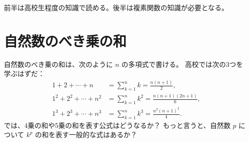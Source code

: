 {
\newcommand{\Natural}{\mathbf{N}}
\newcommand{\Rational}{\mathbf{Q}}
\newcommand{\Complex}{\mathbf{C}}

\renewcommand{\equationautorefname}{式}
\newtheorem{theorem}{定理}
\renewcommand{\theoremautorefname}{定理}
\newtheorem*{example*}{例}

\newtheorem{remark}[remark]{注意}
\newcommand{\remarkautorefname}{注意}

\newtheorem{lemma}[lemma]{補題}
\newcommand{\lemmaautorefname}{補題}

\newtheorem{proposition}[proposition]{命題}
\newcommand{\propositionautorefname}{命題}

\newtheorem{corollary}[corollary]{系}
\newcommand{\corollaryautorefname}{系}

\newcommand{\stirlingI}{\genfrac[]{0pt}{}} %
\newcommand{\stirlingII}{\genfrac\{\}{0pt}{}} %
\newcommand{\risingFactorial}[2]{{#1}^{\overline{#2}}}
\newcommand{\fallingFactorial}[2]{{#1}^{\underline{#2}}}

\renewcommand{\proofname}{証明}


前半は高校生程度の知識で読める。後半は複素関数の知識が必要となる。

\section{自然数のべき乗の和}
自然数のべき乗の和は、次のように $n$ の多項式で書ける。
高校では次の3つを学ぶはずだ：
\begin{align*}
  1+2+\dotsb+n&=\sum_{k=1}^n k=\frac{n(n+1)}{2}, \\
  1^2+2^2+\dotsb+n^2&=\sum_{k=1}^n k^2=\frac{n(n+1)(2n+1)}{6}, \\
  1^3+2^3+\dotsb+n^3&=\sum_{k=1}^n k^3=\frac{n^2(n+1)^2}{4}.
\end{align*}
では、4乗の和や5乗の和を表す公式はどうなるか？
もっと言うと、自然数 $p$ について $k^p$ の和を表す一般的な式はあるか？

}
